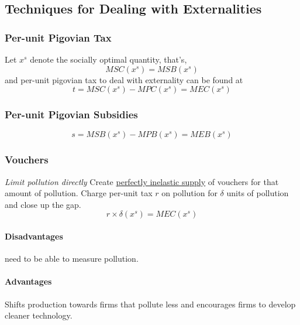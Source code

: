 \documentclass[]{article}
\begin{document}
        \subsection{Techniques for Dealing with Externalities}
            \subsubsection{Per-unit Pigovian Tax}
                \par Let $x^s$ denote the socially optimal quantity, that's, 
                \[
                    MSC(x^s) = MSB(x^s)
                \]
                and per-unit pigovian tax to deal with externality can be found at
                \[
                    t = MSC(x^s) - MPC(x^s) = MEC(x^s)
                \]
            
            \subsubsection{Per-unit Pigovian Subsidies}
                \[
                    s = MSB(x^s) - MPB(x^s) = MEB(x^s)
                \]
            
            \subsubsection{Vouchers}
                \par \emph{Limit pollution directly} Create \ul{perfectly inelastic supply} of vouchers for that amount of pollution. Charge per-unit tax $r$ on pollution for $\delta$ units of pollution and close up the gap.
                \[
                    r \times \delta(x^s) = MEC(x^s)
                \]
                \paragraph{Disadvantages} need to be able to measure pollution.
                \paragraph{Advantages} Shifts production towards firms that pollute less and encourages firms to develop cleaner technology.
\end{document}
